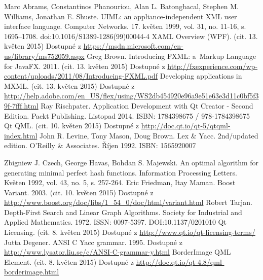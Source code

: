 \documentclass[11pt,twoside,a4paper]{book}
\begin{document}
\begin{thebibliography}{99}
 Marc Abrams, Constantinos Phanouriou, Alan L. Batongbacal, Stephen M. Williams, Jonathan E. Shuste. UIML: an appliance-independent XML user interface language. Computer Networks. 17. květen 1999, vol. 31, no. 11-16, s. 1695–1708. doi:10.1016/S1389-1286(99)00044-4
 XAML Overview (WPF). (cit. 13. květen 2015) Dostupné z \url{https://msdn.microsoft.com/en-us/library/ms752059.aspx} 
 Greg Brown. Introducing FXML: a~Markup Language for JavaFX. 2011. (cit. 13. květen 2015) Dostupné z \url{http://fxexperience.com/wp-content/uploads/2011/08/Introducing-FXML.pdf} 
 Developing applications in MXML. (cit. 13. květen 2015) Dostupné z \url{http://help.adobe.com/en_US/flex/using/WS2db454920e96a9e51e63e3d11c0bf5f39f-7fff.html} 
 Ray Rischpater. Application Development with Qt Creator - Second Edition. Packt Publishing. Listopad 2014. ISBN: 1784398675 / 978-1784398675
 Qt QML. (cit. 10. květen 2015) Dostupné z \url{http://doc.qt.io/qt-5/qtqml-index.html} 
 John R. Levine, Tony Mason, Doug Brown. Lex \& Yacc. 2nd/updated edition. O'Reilly \& Associates. Říjen 1992. ISBN: 1565920007 

 Zbigniew J. Czech, George Havas, Bohdan S. Majewski. An optimal algorithm for generating minimal perfect hash functions. Information Processing Letters. Květen 1992, vol. 43, no. 5, s. 257-264.
 Eric Friedman, Itay Maman. Boost Variant. 2003. (cit. 10. květen 2015) Dostupné z \url{http://www.boost.org/doc/libs/1_54_0/doc/html/variant.html} 
 Robert Tarjan. Depth-First Search and Linear Graph Algorithms. Society for Industrial and Applied Mathematics. 1972. ISSN: 0097-5397. DOI:10.1137/0201010
 Qt Licensing. (cit. 8. květen 2015) Dostupné z \url{http://www.qt.io/qt-licensing-terms/} 
 Jutta Degener. ANSI C Yacc grammar. 1995. Dostupné z \url{http://www.lysator.liu.se/c/ANSI-C-grammar-y.html} 
 BorderImage QML Element. (cit. 8. květen 2015) Dostupné z \url{http://doc.qt.io/qt-4.8/qml-borderimage.html}
\end{thebibliography}


\appendix
\end{document}
